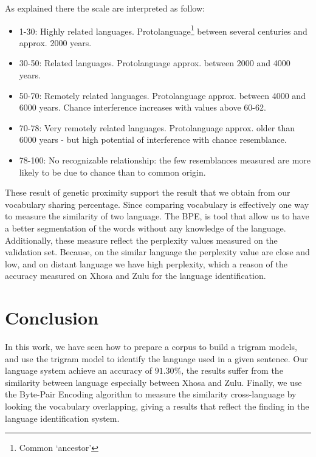 As explained there the scale are interpreted as follow:
\begin{itemize}
\item 1-30: Highly related languages. Protolanguage\footnote{Common `ancestor'} between several centuries and approx. 2000 years.
\item 30-50: Related languages. Protolanguage approx. between 2000 and 4000 years.
\item 50-70: Remotely related languages. Protolanguage approx. between 4000 and 6000 years. Chance interference increases with values above 60-62.
\item 70-78: Very remotely related languages. Protolanguage approx. older than 6000 years - but high potential of interference with chance resemblance.
\item 78-100: No recognizable relationship: the few resemblances measured are more likely to be due to chance than to common origin.
\end{itemize}

These result of genetic proximity support the result that we obtain from our vocabulary sharing percentage. Since comparing vocabulary  is effectively one way to measure the similarity of two language. The BPE, is tool that allow us to have a better segmentation of the words without any knowledge of the language. Additionally, these measure reflect the perplexity values measured on the validation set. Because, on the similar language the perplexity value are close and low, and on distant language we have high perplexity, which a reason of the accuracy measured on Xhosa and Zulu for the language identification.


\section{Conclusion}
In this work, we have seen how to prepare a corpus to build a trigram models, and use the trigram model to identify the language used in a given sentence. Our language system achieve an accuracy of $91.30\%$, the results suffer from the similarity between language especially between Xhosa and Zulu. Finally, we use the Byte-Pair Encoding algorithm to measure the similarity cross-language by looking the vocabulary overlapping, giving a results that reflect the finding in the language identification system.